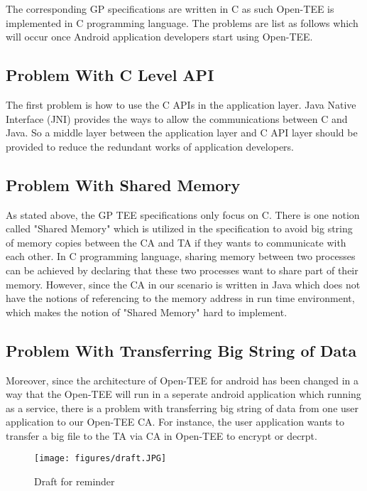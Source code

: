 \documentclass{cseminar}
\begin{document}
The corresponding GP specifications are written in C as such Open-TEE is implemented in C programming language. The problems are list as follows which will occur once Android application developers start using Open-TEE.

\subsection{Problem With C Level API}
The first problem is how to use the C APIs in the application layer. Java Native Interface (JNI) provides the ways to allow the communications between C and Java. So a middle layer between the application layer and C API layer should be provided to reduce the redundant works of application developers.

\subsection{Problem With Shared Memory}
As stated above, the GP TEE specifications only focus on C. There is one notion called "Shared Memory" which is utilized in the specification to avoid big string of memory copies between the CA and TA if they wants to communicate with each other. In C programming language, sharing memory between two processes can be achieved by declaring that these two processes want to share part of their memory. However, since the CA in our scenario is written in Java which does not have the notions of referencing to the memory address in run time environment, which makes the notion of "Shared Memory" hard to implement.

\subsection{Problem With Transferring Big String of Data}
Moreover, since the architecture of Open-TEE for android has been changed in a way that the Open-TEE will run in a seperate android application which running as a service, there is a problem with transferring big string of data from one user application to our Open-TEE CA. For instance, the user application wants to transfer a big file to the TA via CA in Open-TEE to encrypt or decrpt.

\begin{figure}[t]
  \begin{center}
    \texttt{[image: figures/draft.JPG]}
    \caption{Draft for reminder}
    \label{fig:architec}
  \end{center}
\end{figure}
\end{document}

